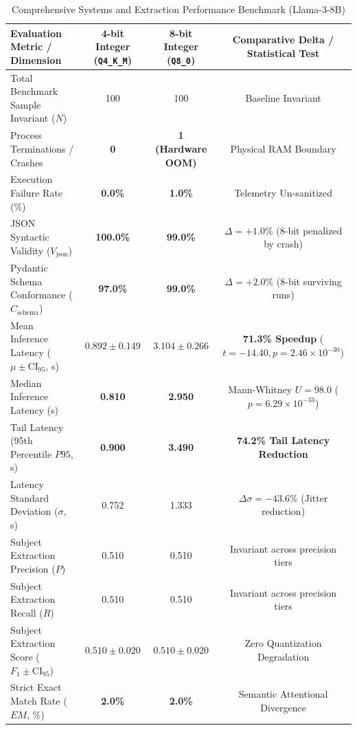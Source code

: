 \documentclass[conference]{IEEEtran}
\begin{document}
{\begin{table}[t]
\caption{Comprehensive Systems and Extraction Performance Benchmark (Llama-3-8B)}
\begin{center}
\begin{tabular}{lccc}
\toprule
\textbf{Evaluation Metric / Dimension} & \textbf{4-bit Integer (\texttt{Q4\_K\_M})} & \textbf{8-bit Integer (\texttt{Q8\_0})} & \textbf{Comparative Delta / Statistical Test} \\
\midrule
Total Benchmark Sample Invariant ($N$) & 100 & 100 & Baseline Invariant \\
Process Terminations / Crashes & \textbf{0} & \textbf{1 (Hardware OOM)} & Physical RAM Boundary \\
Execution Failure Rate (\%) & \textbf{0.0\%} & \textbf{1.0\%} & Telemetry Un-sanitized \\
JSON Syntactic Validity ($V_{\text{json}}$) & \textbf{100.0\%} & \textbf{99.0\%} & $\Delta = +1.0\%$ (8-bit penalized by crash) \\
Pydantic Schema Conformance ($C_{\text{schema}}$) & \textbf{97.0\%} & \textbf{99.0\%} & $\Delta = +2.0\%$ (8-bit surviving runs) \\
Mean Inference Latency ($\mu \pm \text{CI}_{95}$, s) & $\mathbf{0.892 \pm 0.149}$ & $\mathbf{3.104 \pm 0.266}$ & \textbf{71.3\% Speedup} ($t = -14.40, p = 2.46 \times 10^{-30}$) \\
Median Inference Latency (s) & \textbf{0.810} & \textbf{2.950} & Mann-Whitney $U = 98.0$ ($p = 6.29 \times 10^{-33}$) \\
Tail Latency (95th Percentile $P95$, s) & \textbf{0.900} & \textbf{3.490} & \textbf{74.2\% Tail Latency Reduction} \\
Latency Standard Deviation ($\sigma$, s) & 0.752 & 1.333 & $\Delta \sigma = -43.6\%$ (Jitter reduction) \\
Subject Extraction Precision ($P$) & 0.510 & 0.510 & Invariant across precision tiers \\
Subject Extraction Recall ($R$) & 0.510 & 0.510 & Invariant across precision tiers \\
Subject Extraction Score ($F_1 \pm \text{CI}_{95}$) & $\mathbf{0.510 \pm 0.020}$ & $\mathbf{0.510 \pm 0.020}$ & Zero Quantization Degradation \\
Strict Exact Match Rate ($EM$, \%) & \textbf{2.0\%} & \textbf{2.0\%} & Semantic Attentional Divergence \\
\bottomrule
\end{tabular}
\end{center}
\label{tab:results}
\end{table}

}
\end{document}
